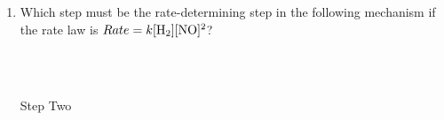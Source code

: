 \documentclass[12pt]{article}
\begin{document}
\begin{enumerate}
\item Which step must be the rate-determining step in the following mechanism if the rate law is $Rate=k[\ce{H2}][\ce{NO}]^2$?

  \begin{center}
    \\
    \\
  \end{center}

  \begin{center}
    Step Two
  \end{center}

\end{enumerate}
\end{document}
